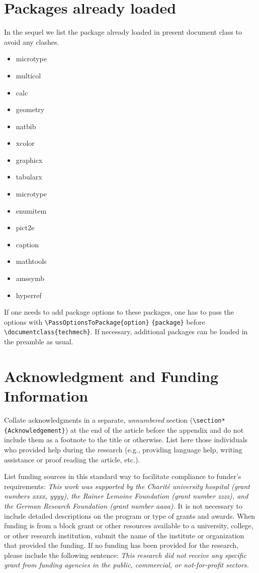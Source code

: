 \documentclass{techmech}
\begin{document}
\section{Packages already loaded}
In the sequel we list the package already loaded in present document class to avoid any clashes.
\begin{multicols}{3}
\begin{itemize}
\item microtype
\item multicol
\item calc
\item geometry
\item natbib
\item  xcolor
\item  graphicx
\item  tabularx
\item microtype
\item  enumitem
\item  pict2e
\item caption
\item mathtools
\item amssymb
\item hyperref
\end{itemize}
\end{multicols}
If one needs to add package options to these packages, one has to pass the options with \verb|\PassOptionsToPackage{option}| \verb|{package}| before \verb|\documentclass{techmech}|. If necessary, additional packages can be loaded in the preamble as usual.
\section*{Acknowledgment and Funding Information}
Collate acknowledgments in a separate, \textit{unnumbered} section (\verb|\section*{Acknowledgement}|) at the end of the article before the appendix and do
not include them as a footnote to the title or otherwise. List here those
individuals who provided help during the research (e.g., providing language help, writing assistance
or proof reading the article, etc.).

List funding sources in this standard way to facilitate compliance to funder's requirements: \textit{This work was supported by the Charit\'{e} university hospital (grant numbers xxxx, yyyy), the Rainer Lemoine Foundation (grant number zzzz), and the German Research Foundation (grant number aaaa).}
It is not necessary to include detailed descriptions on the program or type of grants and awards. When
funding is from a block grant or other resources available to a university, college, or other research
institution, submit the name of the institute or organization that provided the funding.
If no funding has been provided for the research, please include the following sentence:
\textit{This research did not receive any specific grant from funding agencies in the public, commercial, or
not-for-profit sectors.}
\end{document}
